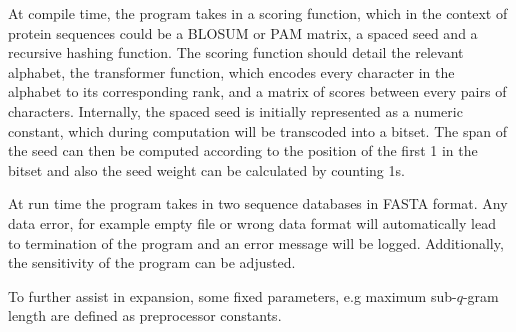 At compile time, the program takes in a scoring function, which in the context of protein sequences could be a BLOSUM or PAM matrix, a spaced seed and a recursive hashing function. The scoring function should detail the relevant alphabet, the transformer function, which encodes every character in the alphabet to its corresponding rank, and a matrix of scores between every pairs of characters. Internally, the spaced seed is initially represented as a numeric constant, which during computation will be transcoded into a bitset. The span of the seed can then be computed according to the position of the first 1 in the bitset and also the seed weight can be calculated by counting 1s. 

At run time the program takes in two sequence databases in FASTA format. Any data error, for example empty file or wrong data format will automatically lead to termination of the program and an error message will be logged. Additionally, the sensitivity of the program can be adjusted.

To further assist in expansion, some fixed parameters, e.g maximum sub-$q$-gram length are defined as preprocessor constants.
